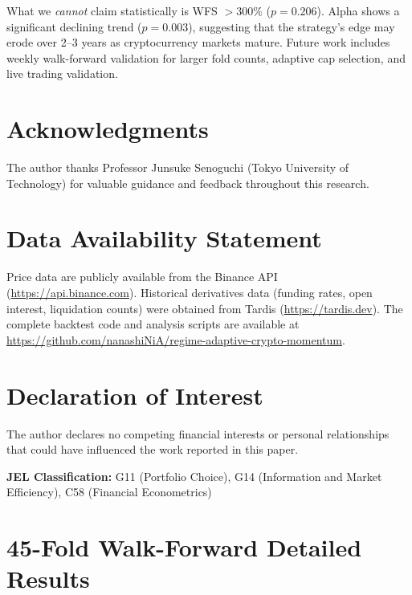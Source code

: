 \documentclass[12pt,a4paper]{article}
\begin{document}
What we \emph{cannot} claim statistically is WFS $> 300\%$ ($p=0.206$). Alpha shows a significant declining trend ($p=0.003$), suggesting that the strategy's edge may erode over 2--3 years as cryptocurrency markets mature. Future work includes weekly walk-forward validation for larger fold counts, adaptive cap selection, and live trading validation.

\section*{Acknowledgments}
The author thanks Professor Junsuke Senoguchi (Tokyo University of Technology) for valuable guidance and feedback throughout this research.

\section*{Data Availability Statement}
Price data are publicly available from the Binance API (\url{https://api.binance.com}). Historical derivatives data (funding rates, open interest, liquidation counts) were obtained from Tardis (\url{https://tardis.dev}). The complete backtest code and analysis scripts are available at \url{https://github.com/nanashiNiA/regime-adaptive-crypto-momentum}.

\section*{Declaration of Interest}
The author declares no competing financial interests or personal relationships that could have influenced the work reported in this paper.

\noindent\textbf{JEL Classification:} G11 (Portfolio Choice), G14 (Information and Market Efficiency), C58 (Financial Econometrics)




\appendix
\section{45-Fold Walk-Forward Detailed Results}
\label{app:folds}
\end{document}
